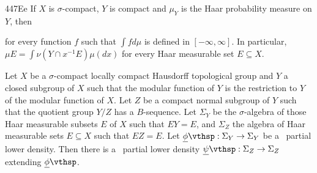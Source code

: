 \spheader 447Ee If $X$ is $\sigma$-compact, $Y$ is compact and $\mu_Y$
is the Haar probability measure on $Y$, then


\noindent for every function $f$
such that
$\int fd\mu$ is defined in $[-\infty,\infty]$.   In particular,
$\mu E=\int\nu(Y\cap x^{-1}E)\mu(dx)$ for every Haar measurable set $E\subseteq X$.

 Let $X$ be a $\sigma$-compact locally compact
Hausdorff topological group and $Y$ a closed subgroup of $X$ such that
the modular function of $Y$ is the restriction to $Y$ of the modular
function of $X$.   Let $Z$ be a compact normal subgroup of $Y$ such that
the quotient group $Y/Z$ has a $B$-sequence.   Let $\Sigma_Y$ be the
$\sigma$-algebra of those Haar measurable subsets $E$ of $X$ such that
$EY=E$, and $\Sigma_Z$ the algebra of Haar measurable sets $E\subseteq X$
such that $EZ=E$.   Let $\undphi:\Sigma_Y\to\Sigma_Y$ be a \lti\
partial lower density.   Then there is a \lti\ partial lower density
$\undpsi:\Sigma_Z\to\Sigma_Z$ extending $\undphi$.


